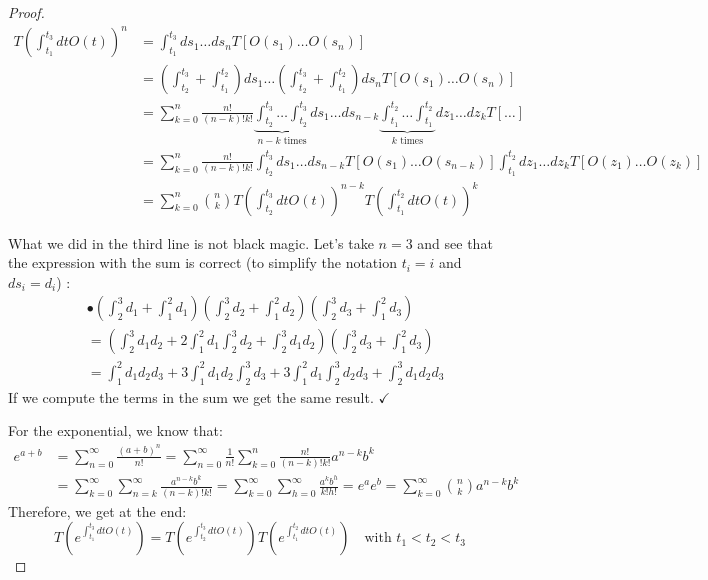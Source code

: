 \documentclass[../main.tex]{subfiles}
\begin{document}
\begin{proof}
\begin{align*}
T\left(\int_{t_1}^{t_3}dtO(t)\right)^n&=\int_{t_1}^{t_3}ds_1\dots ds_nT[O(s_1)\dots O(s_n)]\\
&=\left(\int_{t_2}^{t_3}+\int_{t_1}^{t_2}\right)ds_1\dots\left(\int_{t_2}^{t_3}+\int_{t_1}^{t_2}\right)ds_nT[O(s_1)\dots O(s_n)]\\
&=\sum_{k=0}^n\frac{n!}{(n-k)!k!}\underbrace{\int_{t_2}^{t_3}\dots\int_{t_2}^{t_3}}_{n-k \text{ times}}ds_1\dots ds_{n-k}\underbrace{\int_{t_1}^{t_2}\dots\int_{t_1}^{t_2}}_{k \text{ times}}dz_1\dots dz_kT[\dots]\\
&=\sum_{k=0}^n\frac{n!}{(n-k)!k!}\int_{t_2}^{t_3}ds_1\dots ds_{n-k}T[O(s_1)\dots O(s_{n-k})]\int_{t_1}^{t_2}dz_1\dots dz_kT[O(z_1)\dots O(z_k)]\\
&=\sum_{k=0}^n\binom{n}{k}T\left(\int_{t_2}^{t_3}dtO(t)\right)^{n-k}T\left(\int_{t_1}^{t_2}dtO(t)\right)^k
\end{align*}
\begin{kaobox}[frametitle=Check]
What we did in the third line is not black magic. Let's take $n=3$ and see that the expression with the sum is correct (to simplify the notation $t_i=i$ and $ds_i=d_i$) :
\begin{align*}
&\bullet\left(\int_2^3d_1+\int_1^2d_1\right)\left(\int_2^3d_2+\int_1^2d_2\right)\left(\int_2^3d_3+\int_1^2d_3\right)\\
&=\left(\int_2^3d_1d_2+2\int_1^2d_1\int_2^3d_2+\int_2^3d_1d_2\right)\left(\int_2^3d_3+\int_1^2d_3\right)\\
&=\int_1^2d_1d_2d_3+3\int_1^2d_1d_2\int_2^3d_3+3\int_1^2d_1\int_2^3d_2d_3+\int_2^3d_1d_2d_3
\end{align*}
If we compute the terms in the sum we get the same result. \quad $\checkmark$
\end{kaobox}
For the exponential, we know that:
\begin{align*}
e^{a+b}&=\sum_{n=0}^\infty\frac{(a+b)^n}{n!}=\sum_{n=0}^\infty\frac{1}{n!}\sum_{k=0}^n\frac{n!}{(n-k)!k!}a^{n-k}b^k\\
&=\sum_{k=0}^\infty\sum_{n=k}^\infty\frac{a^{n-k}b^k}{(n-k)!k!}=\sum_{k=0}^\infty\sum_{h=0}^\infty\frac{a^kb^h}{k!h!}=e^ae^b=\sum_{k=0}^\infty\binom{n}{k}a^{n-k}b^k
\end{align*}
Therefore, we get at the end:
\[
T\left(e^{\int_{t_1}^{t_3}dtO(t)}\right)=T\left(e^{\int_{t_2}^{t_3}dtO(t)}\right)T\left(e^{\int_{t_1}^{t_2}dtO(t)}\right) \quad \text{with } t_1<t_2<t_3
\]
\end{proof}
\end{document}
